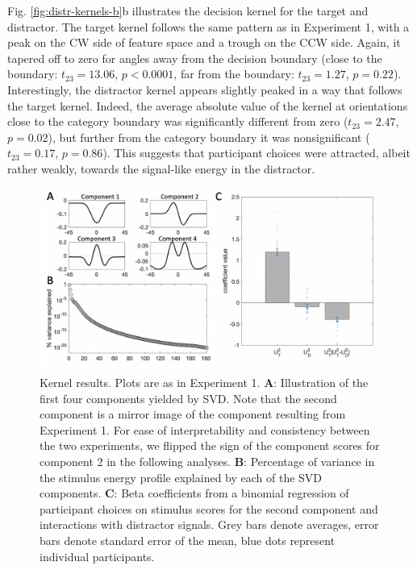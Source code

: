 \documentclass[a4paper, nobind]{templates/ociamthesis}
\begin{document}
Fig. \ref{fig:distr-kernels-b}b illustrates the decision kernel for the target and distractor. The target kernel follows the same pattern as in Experiment 1, with a peak on the CW side of feature space and a trough on the CCW side. Again, it tapered off to zero for angles away from the decision boundary (close to the boundary: \(t_{23}=13.06\), \(p<0.0001\), far from the boundary: \(t_{23}=1.27\), \(p=0.22\)). Interestingly, the distractor kernel appears slightly peaked in a way that follows the target kernel. Indeed, the average absolute value of the kernel at orientations close to the category boundary was significantly different from zero (\(t_{23}=2.47\), \(p=0.02\)), but further from the category boundary it was nonsignificant (\(t_{23}=0.17\), \(p=0.86\)). This suggests that participant choices were attracted, albeit rather weakly, towards the signal-like energy in the distractor.

\begin{figure}

{\centering \includegraphics[width=1\linewidth]{figures/distr-svd-b} 

}

\caption[Experiment 2, Kernel decomposition results]{Kernel results. Plots are as in Experiment 1. $\textbf{A:}$ Illustration of the first four components yielded by SVD. Note that the second component is a mirror image of the component resulting from Experiment 1. For ease of interpretability and consistency between the two experiments, we flipped the sign of the component scores for component 2 in the following analyses. $\textbf{B:}$ Percentage of variance in the stimulus energy profile explained by each of the SVD components. $\textbf{C:}$ Beta coefficients from a binomial regression of participant choices on stimulus scores for the second component and interactions with distractor signals. Grey bars denote averages, error bars denote standard error of the mean, blue dots represent individual participants.}\label{fig:distr-svd-b}
\end{figure}
\end{document}
